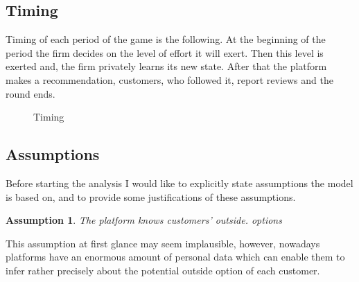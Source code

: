\documentclass[a4paper]{article}
\newtheorem{assumption}[theorem]{Assumption}
\begin{document}
	\subsection{Timing}
	Timing of each period of the game is the following. At the beginning of the period the firm decides on the level of effort it will exert. Then this level is exerted and, the firm privately learns its new state. After that the platform makes a recommendation, customers, who followed it, report reviews and the round ends. 
	\begin{center}
	\begin{figure}[H]
	\caption{Timing}\label{fig1}
	\end{figure}
\end{center}
 	\subsection{Assumptions}
 	Before starting the analysis I would like to explicitly state assumptions the model is based on, and to provide some justifications of these assumptions.
 	\begin{assumption}
 		The platform knows customers' outside. options
 	\end{assumption}
 	This assumption at first glance may seem implausible, however, nowadays platforms have an enormous amount of personal data which can enable them to infer rather precisely about the potential outside option of each customer.
 	
\end{document}
